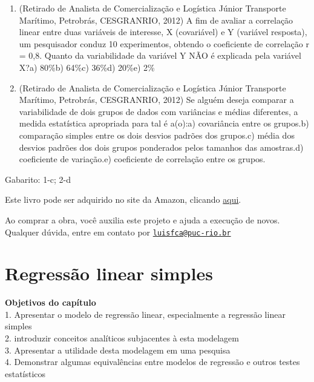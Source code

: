 \documentclass[
]{book}
\newenvironment{objectives}{
  \definecolor{shadecolor}{rgb}{0, 0, 0}  %
  \color{white}
  \begin{shaded}}
 {\end{shaded}}
\begin{document}
\begin{enumerate}
\def\labelenumi{\arabic{enumi}.}
\item
  (Retirado de Analista de Comercialização e Logística Júnior Transporte Marítimo, Petrobrás, CESGRANRIO, 2012) A fim de avaliar a correlação linear entre duas variáveis de interesse, X (covariável) e Y (variável resposta), um pesquisador conduz 10 experimentos, obtendo o coeficiente de correlação r = 0,8. Quanto da variabilidade da variável Y NÃO é explicada pela variável X?a) 80\%b) 64\%c) 36\%d) 20\%e) 2\%
\item
  (Retirado de Analista de Comercialização e Logística Júnior Transporte Marítimo, Petrobrás, CESGRANRIO, 2012) Se alguém deseja comparar a variabilidade de dois grupos de dados com variâncias e médias diferentes, a medida estatística apropriada para tal é a(o):a) covariância entre os grupos.b) comparação simples entre os dois desvios padrões dos grupos.c) média dos desvios padrões dos dois grupos ponderados pelos tamanhos das amostras.d) coeficiente de variação.e) coeficiente de correlação entre os grupos.
\end{enumerate}

Gabarito: 1-c; 2-d

Este livro pode ser adquirido no site da Amazon, clicando \href{https://www.amazon.com.br/gp/product/B097CP7T9M?pf_rd_r=RDZC8XYMBC1WY69T0J8K\&pf_rd_p=abb22e6b-8812-4b76-a424-5f0b098d2c90\&pd_rd_r=ceec1911-f409-4acd-ac8f-2d5bc68dac43\&pd_rd_w=wMUzJ\&pd_rd_wg=ZK85a\&ref_=pd_gw_unk}{aqui}.

Ao comprar a obra, você auxilia este projeto e ajuda a execução de novos. Qualquer dúvida, entre em contato por \href{mailto:luisfca@puc-rio.br}{\nolinkurl{luisfca@puc-rio.br}}

\hypertarget{regressuxe3o-linear-simples}{%
\chapter{Regressão linear simples}\label{regressuxe3o-linear-simples}}

\begin{objectives}
\textbf{Objetivos do capítulo}\\
1. Apresentar o modelo de regressão linear, especialmente a regressão linear simples\\
2. introduzir conceitos analíticos subjacentes à esta modelagem\\
3. Apresentar a utilidade desta modelagem em uma pesquisa\\
4. Demonstrar algumas equivalências entre modelos de regressão e outros testes estatísticos

\end{objectives}
\end{document}
